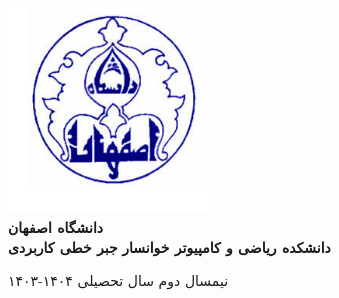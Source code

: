\documentclass[12pt]{book}
\begin{document}
\begin{titlepage}  
	\centering  
	\includegraphics[width=0.4\textwidth]{logo.jpg}\\ %
	\Large
\textbf{	دانشگاه اصفهان} \\
	\vspace{5mm}
	\large
	\textbf{دانشکده ریاضی و کامپیوتر خوانسار}
	\vfill %
	\huge  
	\textbf{جبر خطی کاربردی}  
	
	\vspace{0.5cm} %
	\Large  
	\vfill %
	\large  
	نیمسال دوم سال تحصیلی ۱۴۰۴-۱۴۰۳ 
\end{titlepage} 
\tableofcontents


%
%
\end{document}
